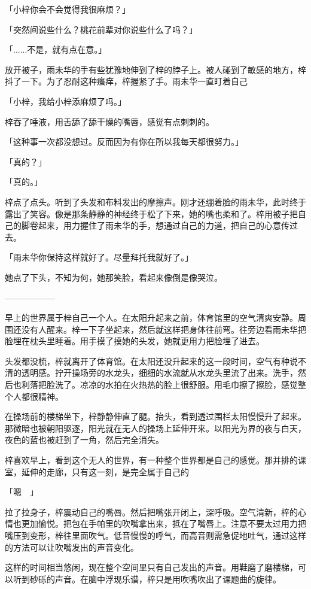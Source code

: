 \documentclass[UTF8]{ctexart}
\begin{document}
    「小梓你会不会觉得我很麻烦？」

    「突然间说些什么？桃花前辈对你说些什么了吗？」

    「......不是，就有点在意。」

    放开被子，雨未华的手有些犹豫地伸到了梓的脖子上。被人碰到了敏感的地方，梓抖了一下。为了忍耐这种瘙痒，梓握紧了手。雨未华一直盯着自己

    「小梓，我给小梓添麻烦了吗。」

    梓吞了唾液，用舌舔了舔干燥的嘴唇，感觉有点刺刺的。

    「这种事一次都没想过。反而因为有你在所以我每天都很努力。」

    「真的？」

    「真的。」

    梓点了点头。听到了头发和布料发出的摩擦声。刚才还绷着脸的雨未华，此时终于露出了笑容。像是那条静静的神经终于松了下来，她的嘴也柔和了。梓用被子把自己的脚卷起来，用力握住了雨未华的手，想通过自己的力道，把自己的心意传过去。

    「雨未华你保持这样就好了。尽量拜托我就好了。」

    她点了下头，不知为何，她那笑脸，看起来像倒是像哭泣。

    ——————

    早上的世界属于梓自己一个人。在太阳升起来之前，体育馆里的空气清爽安静。周围还没有人醒来。梓一下子坐起来，然后就这样把身体往前弯。往旁边看雨未华把脸埋在枕头里睡着。用手摸了摸她的头发，她就更用力把脸埋了进去。

    头发都没梳，梓就离开了体育馆。在太阳还没升起来的这一段时间，空气有种说不清的透明感。拧开操场旁的水龙头，细细的水流就从水龙头里流了出来。洗手，然后也利落把脸洗了。凉凉的水拍在火热热的脸上很舒服。用毛巾擦了擦脸，感觉整个人都很精神。

    在操场前的楼梯坐下，梓静静伸直了腿。抬头，看到透过围栏太阳慢慢升了起来。那微暗也被朝阳驱逐，阳光就在无人的操场上延伸开来。以阳光为界的夜与白天，夜色的蓝也被赶到了一角，然后完全消失。

    梓喜欢早上，看到这个无人的世界，有一种整个世界都是自己的感觉。那并排的课室，延伸的走廊，只有这一刻，是完全属于自己的

    「嗯~~」

    拉了拉身子，梓震动自己的嘴唇。然后把嘴张开闭上，深呼吸。空气清新，梓的心情也更加愉悦。把包在手帕里的吹嘴拿出来，抵在了嘴唇上。注意不要太过用力把嘴压到变形，梓往里面吹气。低音慢慢的呼气，而高音则需急促地吐气，通过这样的方法可以让吹嘴发出的声音变化。

    这样的时间相当悠闲，现在整个空间里只有自己发出的声音。用鞋磨了磨楼梯，可以听到砂砾的声音。在脑中浮现乐谱，梓只是用吹嘴吹出了课题曲的旋律。
\end{document}
